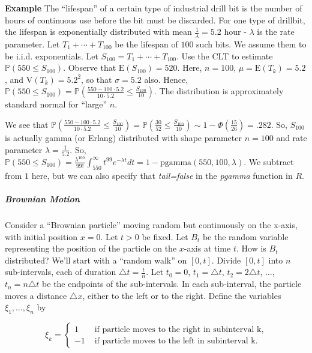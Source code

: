 \documentclass[12pt]{article}
\newcommand{\prob}[1]{\mathbb{P}(#1)}
\newcommand{\expected}[1]{\text{E}(#1)}
\newcommand{\variance}[1]{\text{V}(#1)}
\begin{document}
\begin{tcolorbox}
\textbf{Example} The ``lifespan'' of a certain type of industrial drill bit is the number of hours of continuous use before the bit must be discarded. For one type of drillbit, the lifespan is exponentially distributed with mean $\frac{1}{\lambda} = 5.2$ hour - $\lambda$ is the rate parameter. Let $T_1 + \cdots + T_{100}$ be the lifespan of $100$ such bits. We assume them to be i.i.d. exponentials. Let $S_{100} = T_1 + \cdots + T_{100}$. Use the CLT to estimate $\prob{550 \leq S_{100}}$. Observe that $\expected{S_{100}} = 520$. Here, $n = 100$, $\mu = \expected{T_k} = 5.2$, and $\variance{T_k} = 5.2^2$, so that $\sigma = 5.2$ also. Hence, $\prob{550 \leq S_{100}} = \prob{\frac{550-100 \cdot 5.2}{10 \cdot 5.2} \leq \frac{S_{100}}{10}}$. The distribution is approximately standard normal for ``large'' $n$.

\vspace*{.5cm}
\noindent
We see that $\prob{\frac{550-100 \cdot 5.2}{10 \cdot 5.2} \leq \frac{S_{100}}{10}} = \prob{\frac{30}{52} \leq \frac{S_{100}}{10}} \sim 1 - \Phi(\frac{15}{26}) = .282$. So, $S_{100}$ is actually gamma (or Erlang) distributed with shape parameter $n=100$ and rate parameter $\lambda = \frac{1}{5.2}$. So, $\prob{550 \leq S_{100}} = \frac{\lambda^100}{99!} \int_{550}^{\infty} t^{99} e^{- \lambda t} dt = 1 - \text{pgamma}(550, 100, \lambda)$. We subtract from $1$ here, but we can also specify that \textit{tail=false} in the \textit{pgamma} function in $R$.
\end{tcolorbox}


\subparagraph*{Brownian Motion} Consider a ``Brownian particle'' moving random but continuously on the x-axis, with initial position $x = 0$. Let $t > 0$ be fixed. Let $B_t$ be the random variable representing the position of the particle on the $x$-axis at time $t$. How is $B_t$ distributed? We'll start with a ``random walk'' on $[0,t]$. Divide $[0,t]$ into $n$ sub-intervals, each of duration $\triangle t = \frac{t}{n}$. Let $t_0 = 0$, $t_1 = \triangle t$, $t_2 = 2 \triangle t$, $\ldots$, $t_n = n \triangle t$ be the endpoints of the sub-intervals. In each sub-interval, the particle moves a distance $\triangle x$, either to the left or to the right. Define the variables $\xi_1, \ldots, \xi_n$ by

\[ \xi_k = \begin{cases} 
      1 & \text{ if particle moves to the right in subinterval k}, \\
      -1 & \text{  if particle moves to the left in subinterval k}.
      \end{cases} \]
\end{document}
